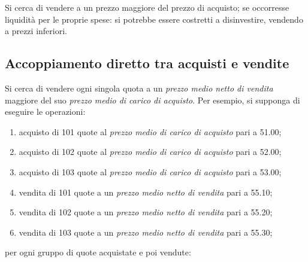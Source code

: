 \documentclass[12pt,a4paper]{article}
\newcommand{\Eur}[1]{\SI{#1}{\text{\euro{}}}}
\begin{document}
Si  cerca di  vendere a  un prezzo  maggiore del  prezzo di  acquisto; se  occorresse
liquidità per le proprie spese: si potrebbe essere costretti a disinvestire, vendendo
a prezzi inferiori.

\subsection{Accoppiamento diretto tra acquisti e vendite}

Si cerca  di vendere  ogni singola quota  a un \emph{prezzo  medio netto  di vendita}
maggiore del suo \emph{prezzo medio di carico di acquisto}.  Per esempio, si supponga
di eseguire le operazioni:
\begin{enumerate}
\item acquisto di \num{101} quote al \emph{prezzo medio di carico di acquisto} pari a
  \Eur{51,00};
\item acquisto di \num{102} quote al \emph{prezzo  medio di carico di acquisto} pari a
  \Eur{52,00};
\item acquisto di \num{103} quote al \emph{prezzo  medio di carico di acquisto} pari a
  \Eur{53,00};
\item vendita  di \num{101}  quote a un  \emph{prezzo medio netto  di vendita}  pari a
  \Eur{55,10};
\item vendita  di \num{102}  quote a un  \emph{prezzo medio netto  di vendita}  pari a
  \Eur{55,20};
\item vendita  di \num{103}  quote a un  \emph{prezzo medio netto  di vendita}  pari a
  \Eur{55,30};
\end{enumerate}
per ogni gruppo di quote acquistate e poi vendute:
\end{document}
